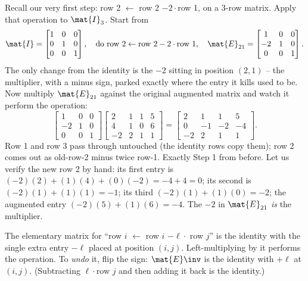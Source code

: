 Recall our very first step: row 2 $\leftarrow$ row 2 $- 2\cdot$row 1, on a
$3$-row matrix. Apply that operation to $\mat{I}_3$. Start from
\[
\mat{I}=\begin{bmatrix}1&0&0\\0&1&0\\0&0&1\end{bmatrix},
\quad\text{do row 2}\leftarrow\text{row 2}-2\cdot\text{row 1}, \quad
\mat{E}_{21}=\begin{bmatrix}1&0&0\\-2&1&0\\0&0&1\end{bmatrix}.
\]
The only change from the identity is the $-2$ sitting in position $(2,1)$ -- the
multiplier, with a minus sign, parked exactly where the entry it kills used to
be. Now multiply $\mat{E}_{21}$ against the original augmented matrix and watch
it perform the operation:
\[
\begin{bmatrix}1&0&0\\-2&1&0\\0&0&1\end{bmatrix}
\left[\begin{array}{ccc|c}
2 & 1 & 1 & 5\\
4 & 1 & 0 & 6\\
-2 & 2 & 1 & 1
\end{array}\right]
=
\left[\begin{array}{ccc|c}
2 & 1 & 1 & 5\\
0 & -1 & -2 & -4\\
-2 & 2 & 1 & 1
\end{array}\right].
\]
Row 1 and row 3 pass through untouched (the identity rows copy them); row 2 comes
out as old-row-2 minus twice row-1. Exactly Step 1 from before. Let us verify the
new row 2 by hand: its first entry is $(-2)(2) + (1)(4) + (0)(-2) = -4 + 4 = 0$;
its second is $(-2)(1)+(1)(1) = -1$; its third $(-2)(1)+(1)(0)=-2$; the augmented
entry $(-2)(5)+(1)(6) = -4$. The $-2$ in $\mat{E}_{21}$ \emph{is} the multiplier.

\begin{focusbox}
The elementary matrix for ``row $i$ $\leftarrow$ row $i$ $-\ell\cdot$ row $j$''
is the identity with the single extra entry $-\ell$ placed at position
$(i,j)$. Left-multiplying by it performs the operation. To \emph{undo} it, flip
the sign: $\mat{E}\inv$ is the identity with $+\ell$ at $(i,j)$. (Subtracting
$\ell\cdot$row $j$ and then adding it back is the identity.)
\end{focusbox}

